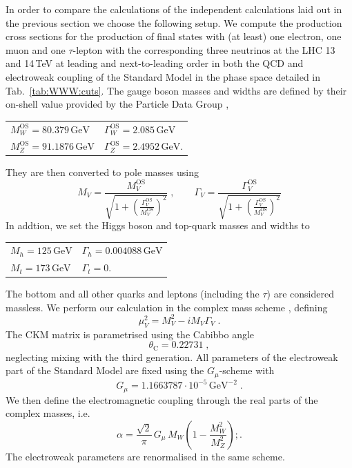 In order to compare the calculations of the independent 
calculations laid out in the previous section we 
choose the following setup.
We compute the production cross sections for the production of 
final states with (at least) one electron, one muon and one 
$\tau$-lepton with the corresponding three neutrinos at the 
LHC 13 and 14\,TeV at leading and next-to-leading order 
in both the QCD and electroweak coupling of the Standard Model
in the phase space detailed in 
Tab.\ \ref{tab:WWW:cuts}. 
The gauge boson masses and widths are defined by their on-shell 
value provided by the Particle Data Group \cite{}, 
\begin{center}
  \begin{tabular}{ll}
    $M_W^\text{OS}=80.379\,\text{GeV}$\qquad & $\Gamma_W^\text{OS}=2.085\,\text{GeV}$ \\
    $M_Z^\text{OS}=91.1876\,\text{GeV}$\qquad & $\Gamma_Z^\text{OS}=2.4952\,\text{GeV}$.
  \end{tabular}
\end{center}
They are then converted to pole masses using 
\begin{equation}
  M_V=\frac{M_V^\text{OS}}{\sqrt{1+\left(\frac{\Gamma_V^\text{OS}}{M_V^\text{OS}}\right)^2}}\;,
  \qquad
  \Gamma_V=\frac{\Gamma_V^\text{OS}}{\sqrt{1+\left(\frac{\Gamma_V^\text{OS}}{M_V^\text{OS}}\right)^2}}
\end{equation}
In addtion, we set the Higgs boson and top-quark masses 
and widths to 
\begin{center}
  \begin{tabular}{ll}
    $M_h=125\,\text{GeV}$ & $\Gamma_h=0.004088\,\text{GeV}$ \\
    $M_t=173\,\text{GeV}$ & $\Gamma_t=0$\;. \\
  \end{tabular}
\end{center}
The bottom and all other quarks and leptons (including the $\tau$) 
are considered massless.
We perform our calculation in the complex mass scheme 
\cite{Denner:2005fg,Denner:2014zga},
defining
\begin{equation}
  \mu_V^2=M_V^2-iM_V\Gamma_V\;.
\end{equation}
The CKM matrix is parametrised using the Cabibbo angle 
\begin{equation}
  \theta_\text{C}=0.22731\;,\nonumber
\end{equation}
neglecting mixing with the third generation. 
All parameters of the electroweak part of the Standard Model 
are fixed using the $G_\mu$-scheme \cite{} with
\begin{equation}
  G_\mu=1.1663787\cdot 10^{-5}\,\text{GeV}^{-2}\;.\nonumber
\end{equation}
We then define the electromagnetic coupling through the 
real parts of the complex masses, i.e.\
\begin{equation}
  \alpha=\frac{\sqrt{2}}{\pi}\,G_\mu\,M_W\left(1-\frac{M_W^2}{M_Z^2}\right);.
\end{equation}
The electroweak parameters are renormalised in the same scheme.

